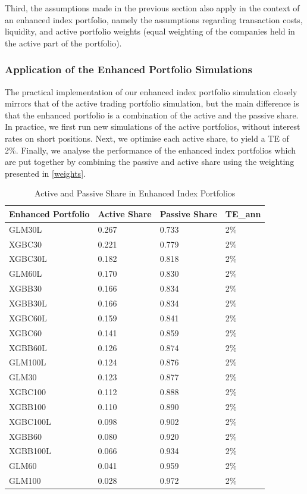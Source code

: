 Third, the assumptions made in the previous section also apply in the context of an enhanced index portfolio, namely the assumptions regarding transaction costs, liquidity, and active portfolio weights (equal weighting of the companies held in the active part of the portfolio).

\subsubsection{Application of the Enhanced Portfolio Simulations}

The practical implementation of our enhanced index portfolio simulation closely mirrors that of the active trading portfolio simulation, but the main difference is that the enhanced portfolio is a combination of the active and the passive share. In practice, we first run new simulations of the active portfolios, without interest rates on short positions. Next, we optimise each active share, to yield a TE of 2\%. Finally, we analyse the performance of the enhanced index portfolios which are put together by combining the passive and active share using the weighting presented in \autoref{weights}.

\begin{table}[H]
\footnotesize
\center
\begin{tabular}{llll}
\toprule
Enhanced Portfolio & Active Share & Passive Share & TE_{ann} \\ 
\midrule
GLM30L & 0.267 & 0.733 & 2\% \\ 
XGBC30 & 0.221 & 0.779 & 2\%\\ 
XGBC30L & 0.182 & 0.818 & 2\%\\ 
GLM60L & 0.170 & 0.830 & 2\%\\ 
XGBB30 & 0.166 & 0.834 & 2\%\\ 
XGBB30L & 0.166 & 0.834 & 2\%\\ 
XGBC60L & 0.159 & 0.841 & 2\%\\ 
XGBC60 & 0.141 & 0.859 & 2\%\\ 
XGBB60L & 0.126 & 0.874 & 2\%\\ 
GLM100L & 0.124 & 0.876 & 2\%\\ 
GLM30 & 0.123 & 0.877 & 2\% \\ 
XGBC100 & 0.112 & 0.888 & 2\% \\ 
XGBB100 & 0.110 & 0.890 & 2\% \\ 
XGBC100L & 0.098 & 0.902 & 2\% \\ 
XGBB60 & 0.080 & 0.920 & 2\% \\ 
XGBB100L & 0.066 & 0.934 & 2\% \\ 
GLM60 & 0.041 & 0.959 & 2\% \\ 
GLM100 & 0.028 & 0.972 & 2\% \\ 
\bottomrule
\end{tabular}
\vspace{1em}
\caption{{Active and Passive Share in Enhanced Index Portfolios}}
\label{weights}
\end{table}

